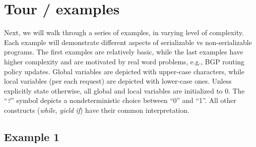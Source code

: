 

\section{Tour / examples}
\label{sec:tour}

Next, we will walk through a series of examples, in varying level of complexity. Each example will demonstrate different aspects of serializable vs non-serializable programs.
%
The first examples are relatively basic, while the last examples have higher complexity and are motivated by real word problems, e.g., BGP routing policy updates.
%
Global variables are depicted with upper-case characters, while local variables (per each request) are depicted with lower-case ones.
%
Unless explicitly state otherwise, all global and local variables are initialized to 0.
%
The ``\textit{?}'' symbol depicts a nondeterministic choice between ``0'' and ``1''. All other constructs (\textit{while}, \textit{yield} \textit{if}) have their common interpretation.


\subsection{Example 1}


